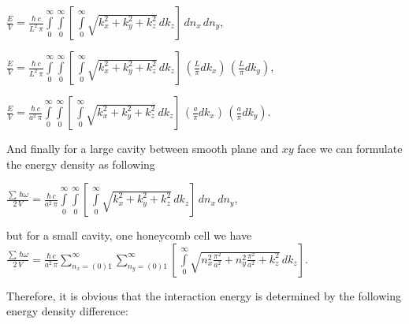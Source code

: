 \documentclass[twoside, 10pt, ptm]{article}
\begin{document}
\begin{multicols}{2}
\noindent
    \(\frac{E}{V} = \frac{\hbar\,c}{L^2\,\pi}\int\limits_{0}^{\infty}\int\limits_{0}^{\infty}\left[\,\int\limits_{0}^{\infty}\sqrt{k_x^2+k_y^2+k_z^2}\,dk_z\right]\,dn_x\,dn_y\),

\noindent
    \(\frac{E}{V} = \frac{\hbar\,c}{L^2\,\pi}\int\limits_{0}^{\infty}\int\limits_{0}^{\infty}\left[\,\int\limits_{0}^{\infty}\sqrt{k_x^2+k_y^2+k_z^2}\,dk_z\right]\,\left(\frac{L}{\pi}dk_x\right)\,\left(\frac{L}{\pi}dk_y\right)\),

\noindent
    \(\frac{E}{V} = \frac{\hbar\,c}{a^2\,\pi}\int\limits_{0}^{\infty}\int\limits_{0}^{\infty}\left[\,\int\limits_{0}^{\infty}\sqrt{k_x^2+k_y^2+k_z^2}\,dk_z\right]\,\left(\frac{a}{\pi}dk_x\right)\,\left(\frac{a}{\pi}dk_y\right)\).

And finally for a large cavity between smooth plane and \(xy\) face we can formulate the energy density as following

    \(\frac{\sum\,\hbar\omega}{2\,V} = \frac{\hbar\,c}{a^2\,\pi}\int\limits_{0}^{\infty}\int\limits_{0}^{\infty}\left[\,\int\limits_{0}^{\infty}\sqrt{k_x^2+k_y^2+k_z^2}\,dk_z\right]\,dn_x\,dn_y\),

but for a small cavity, one honeycomb cell we have
\noindent
    \(\frac{\sum\,\hbar\omega}{2\,V} = \frac{\hbar\,c}{a^2\,\pi}\sum\limits_{n_x=(0)1}^{\infty}\sum\limits_{n_y=(0)1}^{\infty}\left[\,\int\limits_{0}^{\infty}\sqrt{n_x^2\frac{\pi^2}{a^2}+n_y^2\frac{\pi^2}{a^2}+k_z^2}\,dk_z\right]\).




Therefore, it is obvious that the interaction energy is determined by the following energy density difference:
\end{multicols}
\end{document}
